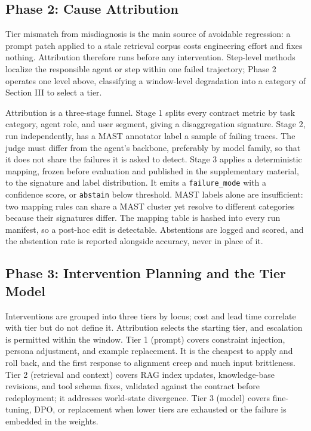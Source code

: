 \documentclass[conference]{IEEEtran}
\begin{document}
\subsection{Phase 2: Cause Attribution}

Tier mismatch from misdiagnosis is the main source of avoidable regression: a prompt patch applied to a stale retrieval corpus costs engineering effort and fixes nothing. Attribution therefore runs before any intervention. Step-level methods \cite{ref11,ref15,ref16,ref17} localize the responsible agent or step within one failed trajectory; Phase 2 operates one level above, classifying a window-level degradation into a category of Section III to select a tier.

Attribution is a three-stage funnel. Stage 1 splits every contract metric by task category, agent role, and user segment, giving a disaggregation signature. Stage 2, run independently, has a MAST annotator \cite{ref8} label a sample of failing traces. The judge must differ from the agent's backbone, preferably by model family, so that it does not share the failures it is asked to detect. Stage 3 applies a deterministic mapping, frozen before evaluation and published in the supplementary material, to the signature and label distribution. It emits a \texttt{failure\_mode} with a confidence score, or \texttt{abstain} below threshold. MAST labels alone are insufficient: two mapping rules can share a MAST cluster yet resolve to different categories because their signatures differ. The mapping table is hashed into every run manifest, so a post-hoc edit is detectable. Abstentions are logged and scored, and the abstention rate is reported alongside accuracy, never in place of it.

\subsection{Phase 3: Intervention Planning and the Tier Model}

Interventions are grouped into three tiers by locus; cost and lead time correlate with tier but do not define it. Attribution selects the starting tier, and escalation is permitted within the window. Tier 1 (prompt) covers constraint injection, persona adjustment, and example replacement. It is the cheapest to apply and roll back, and the first response to alignment creep and much input brittleness. Tier 2 (retrieval and context) covers RAG index updates, knowledge-base revisions, and tool schema fixes, validated against the contract before redeployment; it addresses world-state divergence. Tier 3 (model) covers fine-tuning, DPO, or replacement when lower tiers are exhausted or the failure is embedded in the weights.
\end{document}
